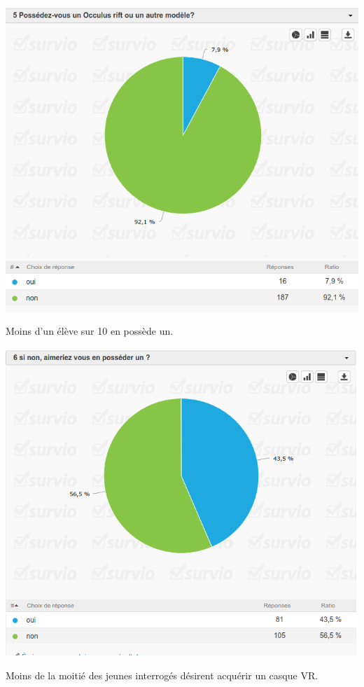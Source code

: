 \documentclass[12pt, a4paper]{report}
\begin{document}
\begin{center}
\includegraphics[scale=0.5]{5.png}

Moins d'un élève sur 10 en possède un.
\end{center}

\begin{center}
\includegraphics[scale=0.5]{6.png}

Moins de la moitié des jeunes interrogés désirent acquérir un casque VR.
\end{center}
\end{document}
